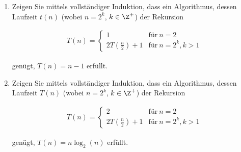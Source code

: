 
\begin{exercise}

\phantom{}

\begin{enumerate}[label = (\alph*)]

    \item Zeigen Sie mittels vollständiger Induktion, dass ein Algorithmus, dessen Laufzeit $t(n)$ (wobei $n = 2^k$, $k \in \Z^+$) der Rekursion

    \begin{align*}
        T(n)
        =
        \begin{cases}
            1                    & \text{für}~ n = 2 \\
            2T (\frac{n}{2}) + 1 & \text{für}~ n = 2^k, k > 1
        \end{cases}
    \end{align*}

    genügt, $T(n) = n - 1$ erfüllt.

    \item Zeigen Sie mittels vollständiger Induktion, dass ein Algorithmus, dessen Laufzeit $T(n)$ (wobei $n = 2^k$, $k \in \Z^+$) der Rekursion

    \begin{align*}
        T(n)
        =
        \begin{cases}
            2                    & \text{für}~ n = 2 \\
            2T (\frac{n}{2}) + 1 & \text{für}~ n = 2^k, k > 1
        \end{cases}
    \end{align*}

    genügt, $T(n) = n \log_2{(n)}$ erfüllt.

\end{enumerate}


\end{exercise}


